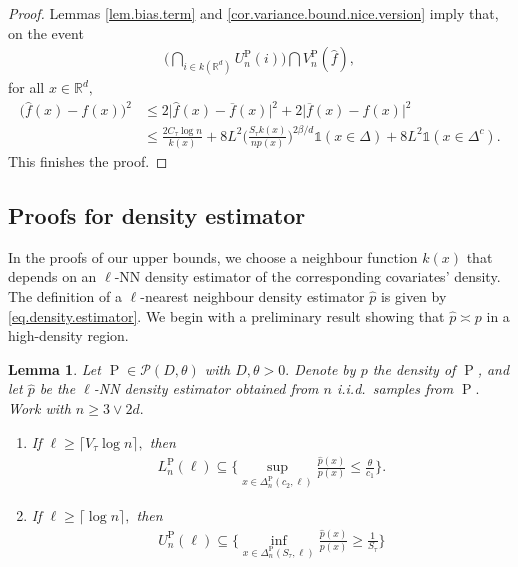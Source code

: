 \documentclass[10pt]{article}
\newcommand{\mP}{\mathcal{P}}
\newcommand{\RR}{\mathbb{R}}
\renewcommand{\P}{\operatorname{P}}
\newcommand{\wh}{\widehat}
\newcommand{\ol}{\overline}
\newtheorem{lemma}[theorem]{Lemma}
\begin{document}
\begin{proof}
    Lemmas \ref{lem.bias.term} and \ref{cor.variance.bound.nice.version} imply that, on the event
    \begin{align*}
        \bigg(\bigcap_{i \in k(\RR^d)} U_n^{\P}(i)\bigg)\bigcap V_n^{\P}(\wh f),
    \end{align*}
    for all $x \in \RR^d,$
    \begin{align*}
        \big(\wh f(x) - f(x)\big)^2 &\leq 2\big|\wh f(x) - \ol f(x)\big|^2 + 2|\ol f(x) - f(x)\big|^2\\
        &\leq \frac{2C_\tau \log n}{k(x)} + 8L^2\bigg(\frac{S_\tau k(x)}{np(x)}\bigg)^{2\beta/d}\mathds{1}(x \in \Delta) + 8L^2\mathds{1}(x \in \Delta^c).
    \end{align*}
    This finishes the proof.
\end{proof}

\subsection{Proofs for density estimator}

In the proofs of our upper bounds, we choose a neighbour function $k(x)$ that depends on an $\ell$-NN density estimator of the corresponding covariates' density. The definition of a $\ell$-nearest neighbour density estimator $\wh p$ is given by \eqref{eq.density.estimator}. We begin with a preliminary result showing that $\wh p \asymp p$ in a high-density region.


\begin{lemma}
    \label{lem.density.ratio}
    Let $\P \in \mP(D, \theta)$ with $D, \theta > 0.$ Denote by $p$ the density of $\P$, and let $\wh p$ be the $\ell$-NN density estimator obtained from $n$ i.i.d.\ samples from $\P.$ Work with $n \geq 3\vee 2d.$
    \begin{enumerate}
        \item [$(i)$] If $\ell \geq \lceil V_\tau\log n\rceil,$ then
        \begin{align*}
            L_n^{\P}(\ell) \subseteq \Bigg\{\sup_{x \in \Delta_n^{\P}(c_2, \ell)} \frac{\wh p(x)}{p(x)} \leq \frac{\theta}{c_1}\Bigg\}.
        \end{align*}
        \item [$(ii)$] If $\ell \geq \lceil \log n \rceil,$ then
        \begin{align*}
            U_n^{\P}(\ell) \subseteq \Bigg\{\inf_{x \in \Delta_n^{\P}(S_\tau, \ell)} \frac{\wh p(x)}{p(x)} \geq \frac{1}{S_\tau}\Bigg\}
        \end{align*}
    \end{enumerate}
\end{lemma}
\end{document}
